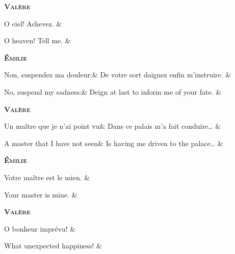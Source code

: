 \documentclass{article}
\newcommand{\dialogue}[1]{%
    \filbreak\begin{center}
	    \textbf{\textsc{#1}}
    \end{center}\nopagebreak}
\begin{document}
\dialogue{Val\`{e}re}
\begin{pairs}
\begin{Leftside}
	\stanza
        O ciel! Achevez.
    \& 
    \endnumbering
\end{Leftside}
\begin{Rightside}
	\stanza
	    O heaven! Tell me.
    \& 
    \endnumbering
\end{Rightside} 
\Columns 
\end{pairs}

\dialogue{\'{E}milie}
\begin{pairs}
\begin{Leftside}
	\stanza
		Non, suspendez ma douleur:&
		De votre sort daignez enfin m'instruire.
    \& 
    \endnumbering
\end{Leftside}
\begin{Rightside}
	\stanza
		No, suspend my sadness:&
		Deign at last to inform me of your fate.
    \& 
    \endnumbering
\end{Rightside} 
\Columns 
\end{pairs}

\dialogue{Val\`{e}re}
\begin{pairs}
\begin{Leftside}
	\stanza
		Un ma\^{i}tre que je n'ai point vu&
		Dans ce palais m'a fait conduire\ldots{}
    \& 
    \endnumbering
\end{Leftside}
\begin{Rightside}
	\stanza
		A master that I have not seen&
		Is having me driven to the palace\ldots{}
    \& 
    \endnumbering
\end{Rightside} 
\Columns 
\end{pairs}

\dialogue{\'{E}milie}
\begin{pairs}
\begin{Leftside}
	\stanza
        Votre ma\^{i}tre est le mien.
    \& 
    \endnumbering
\end{Leftside}
\begin{Rightside}
	\stanza
	    Your master is mine.
    \& 
    \endnumbering
\end{Rightside} 
\Columns 
\end{pairs}

\dialogue{Val\`{e}re}
\begin{pairs}
\begin{Leftside}
	\stanza
        O bonheur impr\'{e}vu!
    \& 
    \endnumbering
\end{Leftside}
\begin{Rightside}
	\stanza
	    What unexpected happiness!
    \& 
    \endnumbering
\end{Rightside} 
\Columns 
\end{pairs}
\end{document}
